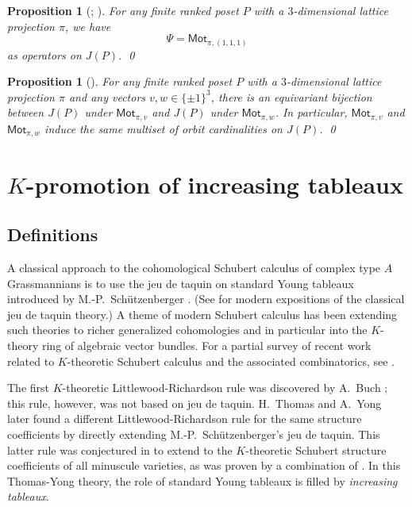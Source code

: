 \documentclass[12pt]{amsart}
\newtheorem{proposition}[theorem]{Proposition}
\theoremstyle{definition}
\theoremstyle{remark}
\numberwithin{equation}{section}
\newcommand{\mot}{\ensuremath{\mathsf{Mot}}}
\begin{document}
\begin{proposition}[{\cite[Lemma~1]{Cameron.Fonderflaass}}; {\cite[Proposition~3.18]{DPS}}]
\label{prop:psi_is_toggle}
For any finite ranked poset $P$ with a $3$-dimensional lattice projection $\pi$, we have 
\[
 \Psi  = \mot_{\pi, (1,1,1)}  \] 
 as operators on $J(P)$. \qed
\end{proposition}

\begin{proposition}[{\cite[Theorem~3.25]{DPS}}]
\label{prop:conjugate_actions}
For any finite ranked poset $P$ with a $3$-dimensional lattice projection $\pi$ and any vectors $v,w \in \{ \pm 1 \}^3$, there is an equivariant bijection between $J(P)$ under $\mot_{\pi, v}$ and $J(P)$ under $\mot_{\pi,w}$. In particular, $\mot_{\pi, v}$ and $\mot_{\pi,w}$ induce the same multiset of orbit cardinalities on $J(P)$. \qed
\end{proposition}

\section{$K$-promotion of increasing tableaux}\label{sec:Kpromotion}

\subsection{Definitions}\label{sec:Kpro_defs}
A classical approach to the cohomological Schubert calculus of complex type $A$ Grassmannians is to use the jeu de taquin on standard Young tableaux introduced by M.-P.~Sch\"utzenberger \cite{Schutzenberger:jdt}. (See \cite{Fulton, Manivel} for modern expositions of the classical jeu de taquin theory.) A theme of modern Schubert calculus has been extending such theories to richer generalized cohomologies and in particular into the $K$-theory ring of algebraic vector bundles. For a partial survey of recent work related to $K$-theoretic Schubert calculus and the associated combinatorics, see \cite{Pechenik.Yong:genomic}.

The first $K$-theoretic Littlewood-Richardson rule was discovered by A.~Buch \cite{Buch}; this rule, however, was not based on jeu de taquin. H.~Thomas and A.~Yong \cite{Thomas.Yong:K} later found a different Littlewood-Richardson rule for the same structure coefficients by directly extending M.-P.~Sch\"utzenberger's jeu de taquin. This latter rule was conjectured in \cite{Thomas.Yong:K} to extend to the $K$-theoretic Schubert structure coefficients of all minuscule varieties, as was proven by a combination of \cite{Buch.Ravikumar,Clifford.Thomas.Yong,Buch.Samuel}. In this Thomas-Yong theory, the role of standard Young tableaux is filled by \emph{increasing tableaux}.
\end{document}
